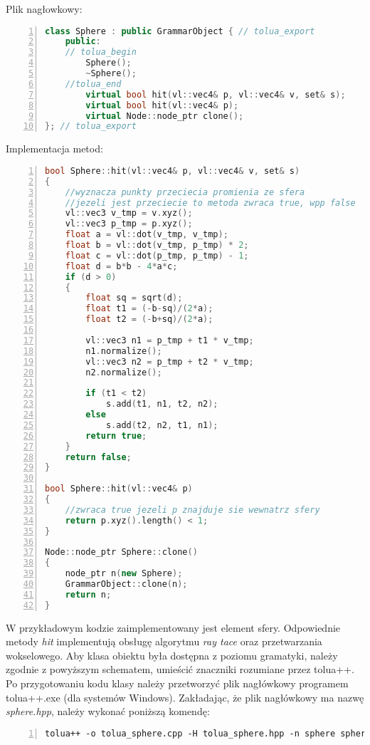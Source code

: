 Plik nagłowkowy:
{
\small
\begin{lstlisting}[language=C++,numbers=left,frame=single,numberstyle=\tiny,backgroundcolor=\color{code_back},breaklines=true]
class Sphere : public GrammarObject { // tolua_export
    public:
    // tolua_begin
        Sphere();
        ~Sphere();
    //tolua_end
        virtual bool hit(vl::vec4& p, vl::vec4& v, set& s);
        virtual bool hit(vl::vec4& p);
        virtual Node::node_ptr clone();
}; // tolua_export
\end{lstlisting}
}
Implementacja metod:
{
\small
\begin{lstlisting}[language=C++,numbers=left,frame=single,numberstyle=\tiny,backgroundcolor=\color{code_back},breaklines=true]
bool Sphere::hit(vl::vec4& p, vl::vec4& v, set& s)
{
    //wyznacza punkty przeciecia promienia ze sfera
    //jezeli jest przeciecie to metoda zwraca true, wpp false
    vl::vec3 v_tmp = v.xyz();
    vl::vec3 p_tmp = p.xyz();
    float a = vl::dot(v_tmp, v_tmp);
    float b = vl::dot(v_tmp, p_tmp) * 2;
    float c = vl::dot(p_tmp, p_tmp) - 1;
    float d = b*b - 4*a*c;
    if (d > 0)
    {
        float sq = sqrt(d);
        float t1 = (-b-sq)/(2*a);
        float t2 = (-b+sq)/(2*a);

        vl::vec3 n1 = p_tmp + t1 * v_tmp;
        n1.normalize();
        vl::vec3 n2 = p_tmp + t2 * v_tmp;
        n2.normalize();

        if (t1 < t2)
            s.add(t1, n1, t2, n2);
        else
            s.add(t2, n2, t1, n1);
        return true;
    }
    return false;
}

bool Sphere::hit(vl::vec4& p)
{
    //zwraca true jezeli p znajduje sie wewnatrz sfery
    return p.xyz().length() < 1;
}

Node::node_ptr Sphere::clone()
{
    node_ptr n(new Sphere);
    GrammarObject::clone(n);
    return n;
}
\end{lstlisting}
}

W przykładowym kodzie zaimplementowany jest element sfery. Odpowiednie metody
\emph{hit} implementują obsługę algorytmu \emph{ray tace} oraz przetwarzania wokselowego.
Aby klasa obiektu była dostępna z poziomu gramatyki, należy zgodnie z powyższym
schematem, umieścić znaczniki rozumiane przez tolua++. Po przygotowaniu kodu
klasy należy przetworzyć plik nagłówkowy programem tolua++.exe (dla systemów
Windows). Zakładając, że plik nagłówkowy ma nazwę {\em sphere.hpp}, należy
wykonać poniższą komendę:
{
\small
\begin{lstlisting}[numbers=left,frame=single,numberstyle=\tiny,backgroundcolor=\color{code_back},breaklines=true]
tolua++ -o tolua_sphere.cpp -H tolua_sphere.hpp -n sphere sphere.hpp
\end{lstlisting}
}

